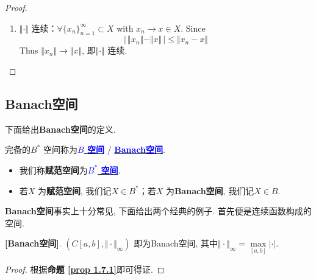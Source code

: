 \begin{defn}
\begin{rmk}
\begin{itemize}
\begin{itemize}
\begin{proof}
\begin{enumerate}
							\vspace*{2em}
							
							\item $\Vert \cdot \Vert$ 连续：$\forall \{ x_n \}_{n = 1}^{\infty} \subset X$ with $x_n \to x \in X$. Since
							\[ \Big| \, \Vert x_n \Vert - \Vert x \Vert \, \Big| \leq \Vert x_n - x \Vert \]
							Thus $\Vert x_n \Vert \to \Vert x \Vert$, 即$\Vert \cdot \Vert$ 连续.
						\end{enumerate}
					\end{proof}
				\end{itemize}
			\end{itemize}
		\end{rmk}
	\end{defn}

\newpage

\subsection{Banach空间}
	下面给出\textbf{Banach空间}的定义.
	
	\begin{defn}\label{def 2.1.2}
		完备的$B^*$ 空间称为\underline{\textcolor{blue}{\textbf{$B$ 空间}}} / \underline{\textcolor{blue}{\textbf{Banach空间}}}. 
		
		\vspace*{2em}
		
		\begin{rmk}
			\begin{itemize}
				\item 我们称\textbf{赋范空间}为\underline{\textcolor{blue}{\textbf{$B^*$ 空间}}}. 
				
				\vspace*{1em}
				
				\item 若$X$ 为\textbf{赋范空间}, 我们记$X \in B^*$；若$X$ 为\textbf{Banach空间}, 我们记$X \in B$.
			\end{itemize}
		\end{rmk}
	\end{defn}
	
	\vspace{4em}
	
	\textbf{Banach空间}事实上十分常见, 下面给出两个经典的例子. 首先便是连续函数构成的空间.
	\begin{example}\label{ex 2.1.2}
		\textbf{[Banach空间]}. 
		$(C[a , b] , \Vert \cdot \Vert_{\infty})$ 即为Banach空间, 其中$\Vert \cdot \Vert_{\infty} = \underset{[a , b]}{\max} \left| \cdot \right|$. 
			
		\vspace{1em}
			
		\begin{proof}
			根据\textbf{命题 \ref{prop 1.7.1}}即可得证. 
		\end{proof}
	\end{example}
	
